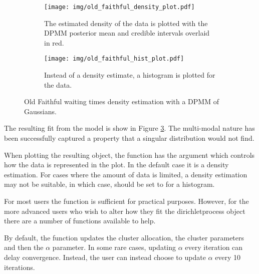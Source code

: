 \documentclass[nojss]{jss}
\begin{document}
\begin{figure}[tb]
\centering
  \begin{subfigure}[t]{0.45\textwidth}
	  \texttt{[image: img/old\_faithful\_density\_plot.pdf]}
	  \caption{The estimated density of the data is plotted with the DPMM posterior mean and credible intervals overlaid in red. }
	  \label{fig:oldfaithfuldens}
	\end{subfigure} \hfill
	\begin{subfigure}[t]{0.45\textwidth}
	  \texttt{[image: img/old\_faithful\_hist\_plot.pdf]}
	  \caption{Instead of a density estimate, a histogram is plotted for the data.}
	  \label{fig:oldfaithfulhist}
	\end{subfigure}
  \caption{Old Faithful waiting times density estimation with a DPMM of Gaussians.}
  \label{fig:oldfaithful}
\end{figure}
The resulting fit from the model is show in Figure \ref{fig:oldfaithful}. The multi-modal nature has been successfully captured a property that a singular distribution would not find.

When plotting the resulting object, the  function has the argument  which controls how the data is represented in the plot. In the default case it is a density estimation. For cases where the amount of data is limited, a density estimation may not be suitable, in which case,  should be set to  for a histogram.

For most users the  function is sufficient for practical purposes. However, for the more advanced users who wish to alter how they fit the dirichletprocess object there are a number of functions available to help.

By default, the  function updates the cluster allocation, the cluster parameters and then the $\alpha$ parameter. In some rare cases, updating $\alpha$ every iteration can delay convergence. Instead, the user can instead choose to update $\alpha$ every 10 iterations.
\newpage %
\begin{Schunk}
\end{Schunk}
\end{document}
